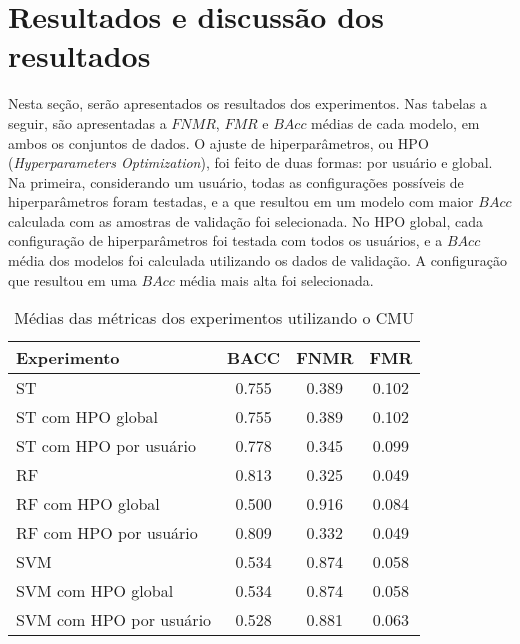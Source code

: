 \section{Resultados e discussão dos resultados}\label{sec:resultados}

Nesta seção, serão apresentados os resultados dos experimentos. Nas tabelas a seguir, são apresentadas a $FNMR$, $FMR$ e $BAcc$ médias de cada modelo, em ambos os conjuntos de dados. O ajuste de hiperparâmetros, ou HPO (\textit{Hyperparameters Optimization}), foi feito de duas formas: por usuário e global. Na primeira, considerando um usuário, todas as configurações possíveis de hiperparâmetros foram testadas, e a que resultou em um modelo com maior $BAcc$ calculada com as amostras de validação foi selecionada. No HPO global, cada configuração de hiperparâmetros foi testada com todos os usuários, e a $BAcc$ média dos modelos foi calculada utilizando os dados de validação. A configuração que resultou em uma $BAcc$ média mais alta foi selecionada.

\begin{table}[htbp]
\centering
\caption{Médias das métricas dos experimentos utilizando o CMU}\label{tab:exp_metric_averages_cmu}
\begin{tabular}{|l|c|c|c|}
\hline
\textbf{Experimento} & \textbf{BACC} & \textbf{FNMR} & \textbf{FMR} \\
\hline
ST & 0.755 & 0.389 & 0.102 \\
\hline
ST com HPO global & 0.755 & 0.389 & 0.102 \\
\hline
ST com HPO por usuário & 0.778 & 0.345 & 0.099 \\
\hline
RF & 0.813 & 0.325 & 0.049 \\
\hline
RF com HPO global & 0.500 & 0.916 & 0.084 \\
\hline
RF com HPO por usuário & 0.809 & 0.332 & 0.049 \\
\hline
SVM & 0.534 & 0.874 & 0.058 \\
\hline
SVM com HPO global & 0.534 & 0.874 & 0.058 \\
\hline
SVM com HPO por usuário & 0.528 & 0.881 & 0.063 \\
\hline
\end{tabular}
\end{table}

